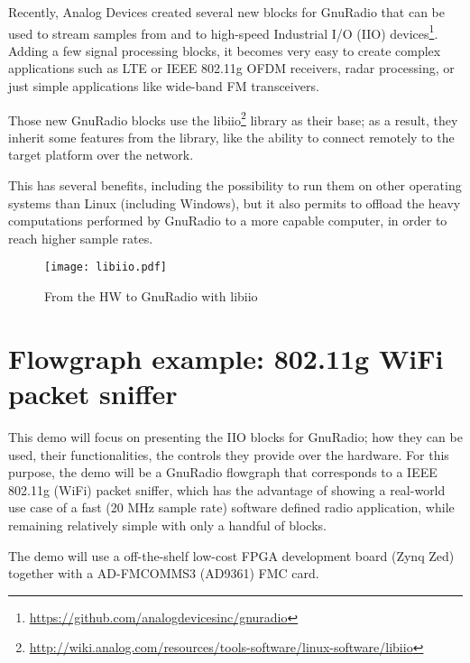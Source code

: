 \documentclass{acm_proc_article-sp}
\begin{document}
Recently, Analog Devices created several new blocks for GnuRadio that can be
used to stream samples from and to high-speed Industrial I/O (IIO)
devices\footnote{ \url{https://github.com/analogdevicesinc/gnuradio}}.
Adding a few signal processing
blocks, it becomes very easy to create complex applications such as
LTE or IEEE 802.11g OFDM receivers, radar processing, or just simple
applications like wide-band FM transceivers.

Those new GnuRadio blocks use the
libiio\footnote{ \url{http://wiki.analog.com/resources/tools-software/linux-software/libiio}}
library as their base; as a result,
they inherit some features from the library, like the ability to connect
remotely to the target platform over the network.

This has several benefits, including the possibility to run them on other
operating systems than Linux (including Windows), but it also permits to
offload the heavy computations performed by GnuRadio to a more capable computer,
in order to reach higher sample rates.

\begin{figure}[htbp]
\centering
\texttt{[image: libiio.pdf]}
\caption{From the HW to GnuRadio with libiio}
\end{figure}

\section{Flowgraph example: 802.11g WiFi packet sniffer}

This demo will focus on presenting the IIO blocks for GnuRadio; how they can be
used, their functionalities, the controls they provide over the hardware.
For this purpose, the demo will be a GnuRadio flowgraph that corresponds to a
IEEE 802.11g (WiFi) packet sniffer, which has the advantage of showing a
real-world use case of a fast (20 MHz sample rate) software defined radio
application, while remaining relatively simple with only a handful of blocks.

The demo will use a off-the-shelf low-cost FPGA development board (Zynq Zed)
together with a AD-FMCOMMS3 (AD9361) FMC card.

\balancecolumns
\end{document}

